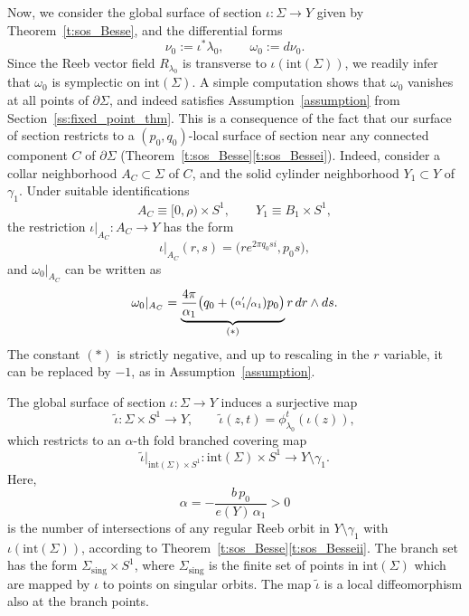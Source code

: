 \documentclass[10pt,a4paper]{amsart}
\newcommand{\Psfrac}[2]{(\sfrac{#1}{#2})}
\theoremstyle{definition}
\let\eul e
\let\diff d
\begin{document}
Now, we consider the global surface of section $\iota:\Sigma\to Y$ given by Theorem~\ref{t:sos_Besse}, and the differential forms
\[
\nu_0:=\iota^*\lambda_0,
\qquad
\omega_0:=\diff\nu_0.
\]
Since the Reeb vector field $R_{\lambda_0}$ is transverse to $\iota(\mathrm{int}(\Sigma))$, we readily infer that $\omega_0$ is symplectic on $\mathrm{int}(\Sigma)$. A simple computation shows that $\omega_0$ vanishes at all points of $\partial\Sigma$, and indeed satisfies Assumption~\ref{assumption} from Section~\ref{ss:fixed_point_thm}. This is a consequence of the fact that our surface of section restricts to a $(p_0,q_0)$-local surface of section near any connected component $C$ of $\partial\Sigma$ (Theorem~\ref{t:sos_Besse}\eqref{t:sos_Bessei}). Indeed, consider a collar neighborhood $A_C\subset \Sigma$ of $C$, and the solid cylinder neighborhood $Y_1\subset Y$ of $\gamma_1$. Under suitable identifications
\[
A_C\equiv [0,\rho)\times S^1,\qquad Y_1\equiv B_1\times S^1,
\]
the restriction $\iota|_{A_C}:A_C\to Y$ has the form
\[
\iota|_{A_C}(r,s)=\big( r e^{2\pi q_0 s i},p_0s \big),
\]
and $\omega_0|_{A_C}$ can be written as
\begin{equation}
\label{e:omega_0_annulus}
\omega_0|_{A_C}
=
\underbrace{\frac{4\pi}{\alpha_1} \big( q_0+\Psfrac{\alpha_1'}{\alpha_1}p_0\big)}_{(*)} r\,\diff r\wedge\diff s.
\end{equation}
The constant $(*)$ is strictly negative, and up to rescaling in the $r$ variable, it can be replaced by $-1$, as in Assumption~\ref{assumption}.

The global surface of section $\iota:\Sigma\to Y$ induces a surjective map
\[
\tilde \iota:\Sigma\times S^1\to Y,\qquad \tilde\iota(z,t)=\phi_{\lambda_0}^t(\iota(z)),
\]
which restricts to an $\alpha$-th fold branched covering map
\begin{equation}
\label{e:alpha_covering_map}
\tilde \iota|_{\mathrm{int}(\Sigma)\times S^1}:\mathrm{int}(\Sigma)\times S^1\to Y\setminus\gamma_1.
\end{equation}
Here,
\[
\alpha=- \frac{b\, p_0}{\eul(Y)\, \alpha_1}>0
\]
is the number of intersections of any regular Reeb orbit in $Y\setminus\gamma_1$ with $\iota(\mathrm{int}(\Sigma))$, according to Theorem~\ref{t:sos_Besse}\eqref{t:sos_Besseii}. The branch set has the form $\Sigma_{\mathrm{sing}}\times S^1$, where $\Sigma_{\mathrm{sing}}$ is the finite set of points in $\mathrm{int}(\Sigma)$ which are mapped by $\iota$ to points on singular orbits. The map $\tilde\iota$ is a local diffeomorphism also at the branch points.
\end{document}
